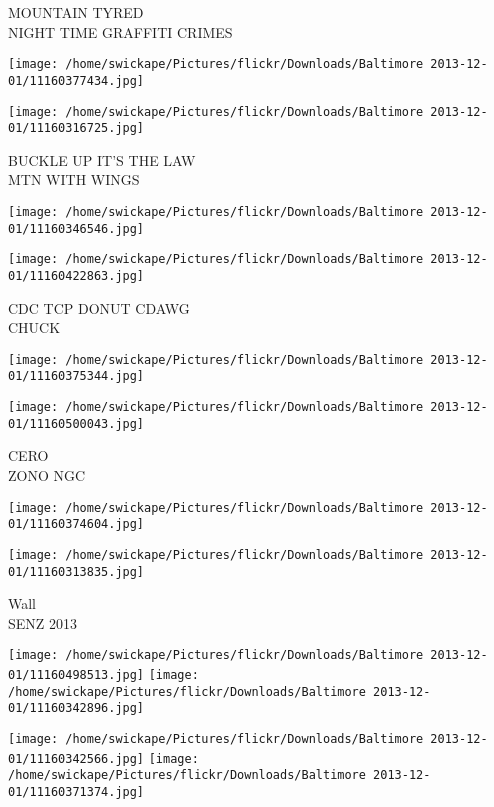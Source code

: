 \documentclass[10pt,letterpaper]{article}
\begin{document}
MOUNTAIN TYRED\\
NIGHT TIME GRAFFITI CRIMES\\
\pagebreak

\texttt{[image: /home/swickape/Pictures/flickr/Downloads/Baltimore 2013-12-01/11160377434.jpg]}

\vspace{0.25in}
\texttt{[image: /home/swickape/Pictures/flickr/Downloads/Baltimore 2013-12-01/11160316725.jpg]}

BUCKLE UP IT'S THE LAW\\
MTN WITH WINGS\\
\pagebreak

\texttt{[image: /home/swickape/Pictures/flickr/Downloads/Baltimore 2013-12-01/11160346546.jpg]}

\vspace{0.25in}
\texttt{[image: /home/swickape/Pictures/flickr/Downloads/Baltimore 2013-12-01/11160422863.jpg]}

CDC TCP DONUT CDAWG\\
CHUCK\\
\pagebreak

\texttt{[image: /home/swickape/Pictures/flickr/Downloads/Baltimore 2013-12-01/11160375344.jpg]}

\vspace{0.25in}
\texttt{[image: /home/swickape/Pictures/flickr/Downloads/Baltimore 2013-12-01/11160500043.jpg]}

CERO\\
ZONO NGC\\
\pagebreak

\texttt{[image: /home/swickape/Pictures/flickr/Downloads/Baltimore 2013-12-01/11160374604.jpg]}

\vspace{0.25in}
\texttt{[image: /home/swickape/Pictures/flickr/Downloads/Baltimore 2013-12-01/11160313835.jpg]}

Wall\\
SENZ 2013\\
\pagebreak

\texttt{[image: /home/swickape/Pictures/flickr/Downloads/Baltimore 2013-12-01/11160498513.jpg]}
\texttt{[image: /home/swickape/Pictures/flickr/Downloads/Baltimore 2013-12-01/11160342896.jpg]}

\texttt{[image: /home/swickape/Pictures/flickr/Downloads/Baltimore 2013-12-01/11160342566.jpg]}
\texttt{[image: /home/swickape/Pictures/flickr/Downloads/Baltimore 2013-12-01/11160371374.jpg]}
\end{document}
